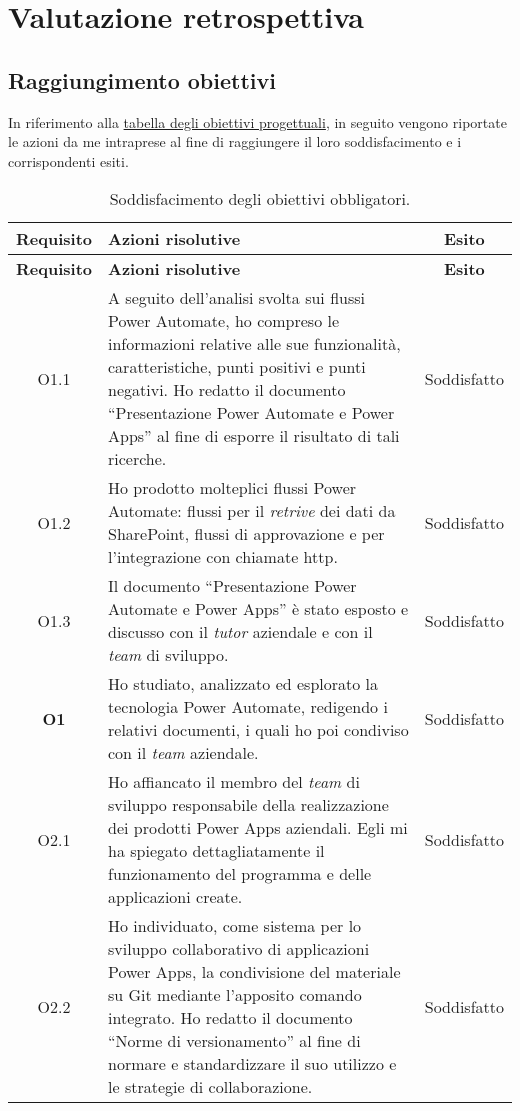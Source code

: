 \chapter{Valutazione retrospettiva}
\label{cap:valutazioneRetrospettiva}
\section{Raggiungimento obiettivi}
In riferimento alla \hyperref[tab:obiettiviProgettuali]{tabella degli obiettivi progettuali}, in seguito vengono riportate le azioni da me intraprese al fine di raggiungere il loro soddisfacimento e i corrispondenti esiti.

\begingroup
\renewcommand\arraystretch{1.3}
\begin{longtable}{|c|p{8cm}|c|}
    \caption{Soddisfacimento degli obiettivi obbligatori.}
    \label{tab:soddObbObbligatori}\\
    \hline \textbf{Requisito} & \textbf{Azioni risolutive} & \textbf{Esito}\\ \endfirsthead
    \hline \textbf{Requisito} & \textbf{Azioni risolutive} & \textbf{Esito}\\ \endhead
    \endfoot
    \hline \endlastfoot
    \hline O1.1  & A seguito dell'analisi svolta sui flussi Power Automate, ho compreso le informazioni relative alle sue funzionalità, caratteristiche, punti positivi e punti negativi. Ho redatto il documento “Presentazione Power Automate e Power Apps” al fine di esporre il risultato di tali ricerche. & Soddisfatto\\
    \hline O1.2  & Ho prodotto molteplici flussi Power Automate: flussi per il \emph{retrive} dei dati da SharePoint, flussi di approvazione e per l'integrazione con chiamate \gls{http}. & Soddisfatto\\
    \hline O1.3  & Il documento “Presentazione Power Automate e Power Apps” è stato esposto e discusso con il \emph{tutor} aziendale e con il \emph{team} di sviluppo. & Soddisfatto\\
    \hline \textbf{O1}    & Ho studiato, analizzato ed esplorato la tecnologia Power Automate, redigendo i relativi documenti, i quali ho poi condiviso con il \emph{team} aziendale. & Soddisfatto\\
    \hline O2.1  & Ho affiancato il membro del \emph{team} di sviluppo responsabile della realizzazione dei prodotti Power Apps aziendali. Egli mi ha spiegato dettagliatamente il funzionamento del programma e delle applicazioni create. & Soddisfatto\\
    \hline O2.2  & Ho individuato, come sistema per lo sviluppo collaborativo di applicazioni Power Apps, la condivisione del materiale su Git mediante l'apposito comando integrato. Ho redatto il documento “Norme di versionamento” al fine di normare e standardizzare il suo utilizzo e le strategie di collaborazione. & Soddisfatto\\

\end{longtable}
